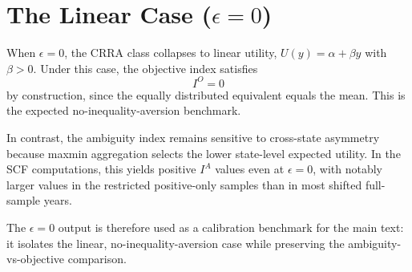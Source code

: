 \documentclass[../../../00-main.tex]{subfiles}
\begin{document}
\section{The Linear Case ($\epsilon = 0$)}
\label{app:eps0-benchmark}

\par When $\epsilon=0$, the CRRA class collapses to linear utility, $U(y)=\alpha+\beta y$ with $\beta>0$. Under this case, the objective index satisfies
\[
I^{O}=0
\]
by construction, since the equally distributed equivalent equals the mean. This is the expected no-inequality-aversion benchmark.

\par In contrast, the ambiguity index remains sensitive to cross-state asymmetry because maxmin aggregation selects the lower state-level expected utility. In the SCF computations, this yields positive $I^{A}$ values even at $\epsilon=0$, with notably larger values in the restricted positive-only samples than in most shifted full-sample years.

\par The $\epsilon=0$ output is therefore used as a calibration benchmark for the main text: it isolates the linear, no-inequality-aversion case while preserving the ambiguity-vs-objective comparison.
\end{document}
